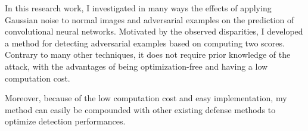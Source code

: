 \begin{summary}
	\label{conclusion}

	In this research work, I investigated in many ways the effects of applying
	Gaussian noise to normal images and adversarial examples on the prediction of
	convolutional neural networks. Motivated by the observed disparities, I
	developed a method for detecting adversarial examples based on computing two
	scores. Contrary to many other techniques, it does not require prior knowledge
	of the attack, with the advantages of being optimization-free and having a low
	computation cost.

	Moreover, because of the low computation cost and easy implementation, my method
	can easily be compounded with other existing defense methods to optimize
	detection performances.
\end{summary}
